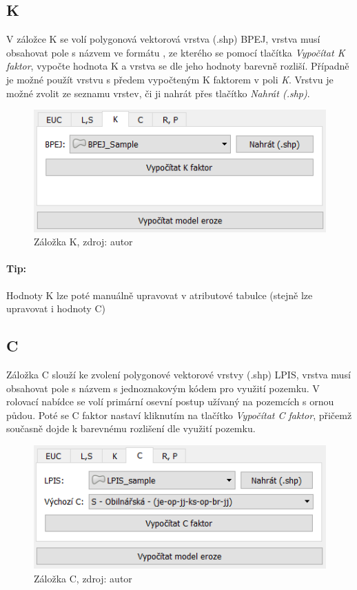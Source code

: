 \subsection{K}
V záložce K se volí polygonová vektorová vrstva (.shp) BPEJ, vrstva musí obsahovat pole s názvem  ve formátu , ze kterého se pomocí tlačítka  \textit{Vypočítat K faktor}, vypočte hodnota K a vrstva se dle jeho hodnoty barevně rozliší. Případně je možné použít vrstvu s předem vypočteným K faktorem v poli  \textit{K}. Vrstvu je možné zvolit ze seznamu vrstev, či ji nahrát přes tlačítko \textit{Nahrát (.shp)}.
\begin{figure}[H] \centering
		\includegraphics[width=.6\textwidth]{./pictures/k.png}
		\caption[Záložka K]{Záložka K, zdroj: autor}
		\label{zalozka_k}
\end{figure}
\paragraph{Tip:}
Hodnoty K lze poté manuálně upravovat v atributové tabulce (stejně lze upravovat i hodnoty C)
\subsection{C}
Záložka C slouží ke zvolení polygonové vektorové vrstvy (.shp) LPIS, vrstva musí obsahovat pole s názvem  s jednoznakovým kódem pro využití pozemku. V rolovací nabídce se volí primární osevní postup užívaný na pozemcích s ornou půdou. Poté se C faktor nastaví kliknutím na tlačítko \textit{Vypočítat C faktor}, přičemž současně dojde k barevnému rozlišení dle využití pozemku.
\begin{figure}[H] \centering
		\includegraphics[width=.6\textwidth]{./pictures/c.png}
		\caption[Záložka C]{Záložka C, zdroj: autor}
		\label{zalozka_c}
\end{figure}

